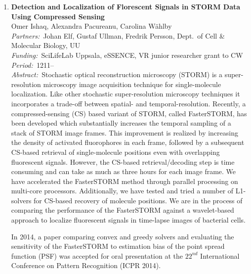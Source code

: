 \documentclass[10pt, a4paper]{article}
\newcommand{\aabstract}[1]{\emph{Abstract:~}#1}
\newcommand{\ffunding}[1]{\emph{Funding:~}#1\\}
\newcommand{\ppartners}[1]{\emph{Partners:~}#1\\}
\newcommand{\pperiod}[1]{\emph{Period:~}#1\\}
\begin{document}
{\begin{enumerate}
\begin{figure}[!h]
	\end{figure}



\item 
\textbf{Detection and Localization of Florescent Signals in STORM Data Using Compressed Sensing}\\
Omer Ishaq, Alexandra Pacureanu, Carolina W\"{a}hlby\\
\ppartners{Johan Elf, Gustaf Ullman, Fredrik Persson, Dept.~of Cell \& Molecular Biology, UU}
\ffunding{SciLifeLab Uppsala, eSSENCE, VR junior researcher grant to CW}
\pperiod{1211--}
\aabstract{Stochastic optical reconstruction microscopy (STORM) is a super-resolution microscopy image acquisition technique for single-molecule localization. Like other stochastic super-resolution microscopy techniques it incorporates a trade-off between spatial- and temporal-resolution. Recently, a compressed-sensing (CS) based variant of STORM, called FasterSTORM, has been developed which substantially increases the temporal sampling of a stack of STORM image frames. This improvement is realized by increasing the density of activated fluorophores in each frame, followed by a subsequent CS-based retrieval of single-molecule positions even with overlapping fluorescent signals. However, the CS-based retrieval/decoding step is time consuming and can take as much as three hours for each image frame. We have accelerated the FasterSTORM method through parallel processing on multi-core processors. Additionally, we have tested and tried a number of L1-solvers for CS-based recovery of molecule positions. We are in the process of comparing the performance of the FasterSTORM against a wavelet-based approach to localize fluorescent signals in time-lapse images of bacterial cells.
	
In 2014, a paper comparing convex and greedy solvers and evaluating the sensitivity of the FasterSTORM to estimation bias of the point spread function (PSF) was accepted for oral presentation at the $22^{nd}$ International Conference on Pattern Recognition (ICPR 2014).}


\end{enumerate}}
\end{document}

